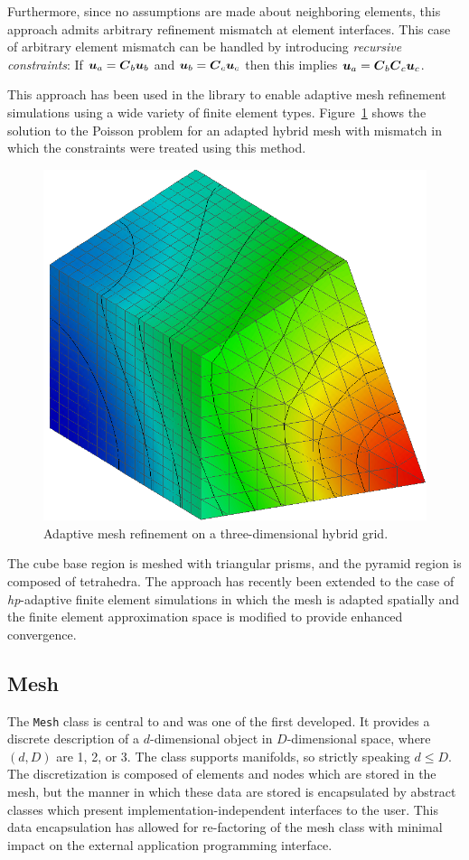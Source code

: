 Furthermore, since no assumptions are made about neighboring elements,
this approach admits arbitrary refinement mismatch at element
interfaces. This case of arbitrary element mismatch can be
handled by introducing \emph{recursive constraints}: If ${\boldsymbol{u}}_a = {\boldsymbol{C}}_b {\boldsymbol{u}}_b$ and
${\boldsymbol{u}}_b = {\boldsymbol{C}}_c {\boldsymbol{u}}_c$ then this implies ${\boldsymbol{u}}_a = {\boldsymbol{C}}_b {\boldsymbol{C}}_c {\boldsymbol{u}}_c$.

This approach has been used in the \libMesh{} library to enable
adaptive mesh refinement simulations using a wide variety of finite
element types. Figure~\ref{fig:amr_hybrid} shows the solution to the
Poisson problem for an adapted hybrid mesh with mismatch in which the
constraints were treated using this method.
\begin{figure}[hbtp]
  \begin{center}
    \includegraphics[width=.55\textwidth]{figures/amr_levels/pointy}
    \caption{Adaptive mesh refinement on a three-dimensional hybrid grid.~\label{fig:amr_hybrid}}
  \end{center}
\end{figure}
 The cube base region is meshed with triangular prisms, and the
pyramid region is composed of tetrahedra.  The approach has recently
been extended to the case of \emph{hp}-adaptive finite element
simulations in which the mesh is adapted spatially and the finite
element approximation space is modified to provide enhanced
convergence.

\subsection{Mesh}
The \texttt{Mesh} class is central to \libMesh{} and was one of the
first developed.  It provides a discrete description of a
$d$-dimensional object in $D$-dimensional space, where $(d,D)$ are 1,
2, or 3.  The class supports manifolds, so strictly speaking $d \le
D$.  The discretization is composed of elements and nodes which are
stored in the mesh, but the manner in which these data are stored is
encapsulated by abstract classes which present
implementation-independent interfaces to the user.  This data
encapsulation has allowed for re-factoring of the mesh class with
minimal impact on the external application programming interface.

